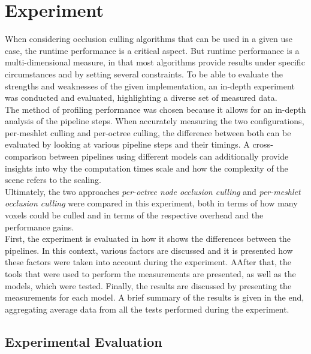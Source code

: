 \chapter{Experiment} \label{cpt-experiment}

When considering occlusion culling algorithms that can be used in a given use case, the runtime 
performance is a critical aspect. But runtime performance is a multi-dimensional measure, in that 
most algorithms provide results under specific circumstances and by setting several constraints.
To be able to evaluate the strengths and weaknesses of the given implementation, an in-depth  
experiment was conducted and evaluated, highlighting a diverse set of measured data. \\ 

\noindent
The method of profiling performance was chosen because it allows for an in-depth analysis of the 
pipeline steps. When accurately measuring the two configurations, per-meshlet culling and 
per-octree culling, the difference between both can be evaluated by looking at various pipeline 
steps and their timings. A cross-comparison between pipelines using different models can additionally 
provide insights into why the computation times scale and how the complexity of the scene refers to 
the scaling.\\

\noindent
Ultimately, the two approaches \emph{per-octree node occlusion culling} and \emph{per-meshlet occlusion culling} 
were compared in this experiment, both in terms of how many voxels could be culled and in terms of the respective 
overhead and the performance gains. \\

\noindent
First, the experiment is evaluated in how it shows the differences between the pipelines. In this context, various 
factors are discussed and it is presented how these factors were taken into account during the experiment. AAfter 
that, the tools that were used to perform the measurements are presented, as well as the models, which were tested.
Finally, the results are discussed by presenting the measurements for each model. A brief summary of the results is 
given in the end, aggregating average data from all the tests performed during the experiment.

\section{Experimental Evaluation} \label{sec-experimental-evaluation}


